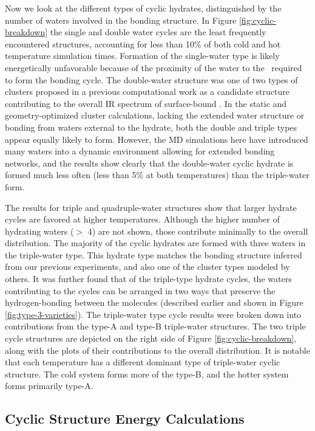 Now we look at the different types of cyclic hydrates, distinguished by the number of waters involved in the bonding structure. In Figure \ref{fig:cyclic-breakdown} the single and double water cycles are the least frequently encountered structures, accounting for less than 10\% of both cold and hot temperature simulation times. Formation of the single-water type is likely energetically unfavorable because of the proximity of the water to the \suldiox~required to form the bonding cycle. The double-water structure was one of two types of clusters proposed in a previous computational work as a candidate structure contributing to the overall IR spectrum of surface-bound \suldiox.\cite{Baer2010} In the static and geometry-optimized cluster calculations, lacking the extended water structure or bonding from waters external to the hydrate, both the double and triple types appear equally likely to form. However, the MD simulations here have introduced many waters into a dynamic environment allowing for extended bonding networks, and the results show clearly that the double-water cyclic hydrate is formed much less often (less than 5\% at both temperatures) than the triple-water form.

The results for triple and quadruple-water structures show that larger hydrate cycles are favored at higher temperatures. Although the higher number of hydrating waters ($>$ 4) are not shown, those contribute minimally to the overall distribution. The majority of the cyclic hydrates are formed with three waters in the triple-water type. This hydrate type matches the bonding structure inferred from our previous experiments, and also one of the cluster types modeled by others.\cite{Tarbuck2005,Tarbuck2006,Baer2010} It was further found that of the triple-type hydrate cycles, the waters contributing to the cycles can be arranged in two ways that preserve the hydrogen-bonding between the molecules (described earlier and shown in Figure \ref{fig:type-3-varieties}). The triple-water type cycle results were broken down into contributions from the type-A and type-B triple-water structures. The two triple cycle structures are depicted on the right side of Figure \ref{fig:cyclic-breakdown}, along with the plots of their contributions to the overall distribution. It is notable that each temperature has a different dominant type of triple-water cyclic structure. The cold system forms more of the type-B, and the hotter system forms primarily type-A.

\subsection {Cyclic Structure Energy Calculations}

